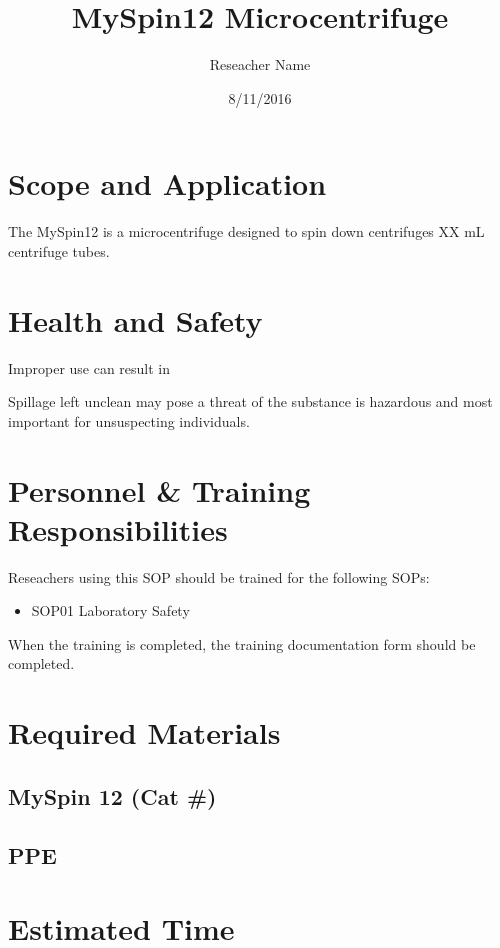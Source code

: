 \documentclass[12pt]{../SOP3_beta}
\title{MySpin12 Microcentrifuge}
\date{8/11/2016}
\author{Reseacher Name}
\begin{document}


\maketitle

\section{Scope and Application}

\NP The MySpin12 is a microcentrifuge designed to spin down centrifuges XX mL centrifuge tubes.

\NP \lipsum[1]

\section{Health and Safety}

\NP Improper use can result in 

\NP Spillage left unclean may pose a threat of the substance is hazardous and most important for unsuspecting individuals.


\section{Personnel \& Training Responsibilities}

\NP Reseachers using this SOP should be trained for the following SOPs:

\begin{itemize}
  \item SOP01 Laboratory Safety
\end{itemize}

When the training is completed, the training documentation form should be completed.

\section{Required Materials}

\subsection{MySpin 12 (Cat \#)}
\subsection{PPE}

\section{Estimated Time}
\end{document}
